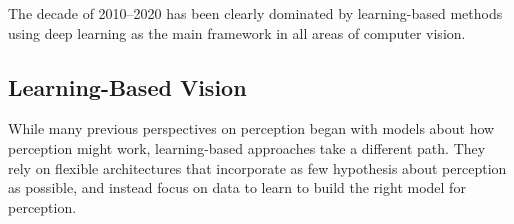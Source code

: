 
The decade of 2010--2020 has been clearly dominated by learning-based methods using deep learning as the main framework in all areas of computer vision.

\subsection{Learning-Based Vision}



While many previous perspectives on perception began with models about how perception might
work, learning-based approaches take a different path. They rely on flexible architectures that incorporate as few hypothesis about perception as possible, and instead focus on data to learn to build the right model for perception.

